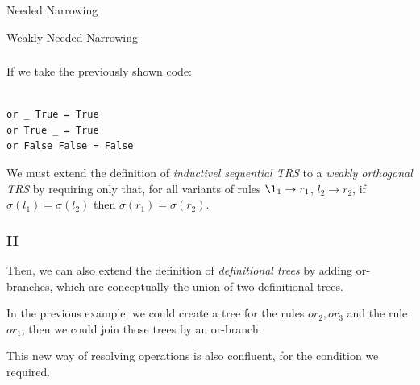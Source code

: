 \documentclass{beamer}
\begin{document}
\begin{section}{Needed Narrowing}
\begin{subsection}{Weakly Needed Narrowing}

\begin{frame}[fragile]
\frametitle{\subsecname}
  If we take the previously shown code:
\begin{verbatim}

or _ True = True
or True _ = True
or False False = False

\end{verbatim}

 We must extend the definition of \textit{inductivel sequential TRS} to a \textit{weakly orthogonal TRS} by requiring only that, for all variants of rules $\l_1 \rightarrow r_1$, $l_2 \rightarrow r_2$, if $\sigma(l_1) = \sigma(l_2)$ then $\sigma(r_1) = \sigma(r_2)$.

\end{frame}

\begin{frame}
\frametitle{{\subsecname} II}
  Then, we can also extend the definition of \textit{definitional trees} by adding or-branches, which are conceptually the union of two definitional trees.

  In the previous example, we could create a tree for the rules {$or_2,or_3$} and the rule {$or_1$}, then we could join those trees by an or-branch.

  This new way of resolving operations is also confluent, for the condition we required.

  \end{frame}
\end{subsection}
\end{section}
\end{document}
